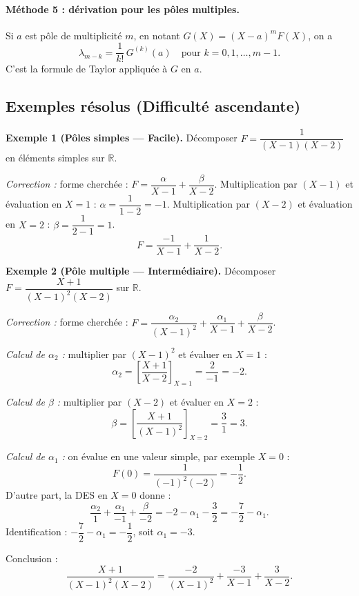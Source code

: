 \documentclass[12pt,a4paper]{report}
\theoremstyle{definition}
\theoremstyle{remark}
\begin{document}
\paragraph{Méthode 5 : dérivation pour les pôles multiples.}
Si $a$ est pôle de multiplicité $m$, en notant $G(X) = (X - a)^m F(X)$, on a
\[ \lambda_{m - k} = \frac{1}{k!}\, G^{(k)}(a) \quad \text{pour } k = 0, 1, \dots, m - 1. \]
C'est la formule de Taylor appliquée à $G$ en $a$.

\subsection{Exemples résolus (Difficulté ascendante)}

\textbf{Exemple 1 (Pôles simples --- Facile).}
Décomposer $F = \dfrac{1}{(X - 1)(X - 2)}$ en éléments simples sur $\mathbb{R}$.

\textit{Correction :} forme cherchée : $F = \dfrac{\alpha}{X - 1} + \dfrac{\beta}{X - 2}$.
Multiplication par $(X - 1)$ et évaluation en $X = 1$ : $\alpha = \dfrac{1}{1 - 2} = -1$.
Multiplication par $(X - 2)$ et évaluation en $X = 2$ : $\beta = \dfrac{1}{2 - 1} = 1$.
\[ F = \frac{-1}{X - 1} + \frac{1}{X - 2}. \]

\medskip

\textbf{Exemple 2 (Pôle multiple --- Intermédiaire).}
Décomposer $F = \dfrac{X + 1}{(X - 1)^2 (X - 2)}$ sur $\mathbb{R}$.

\textit{Correction :} forme cherchée : $F = \dfrac{\alpha_2}{(X - 1)^2} + \dfrac{\alpha_1}{X - 1} + \dfrac{\beta}{X - 2}$.

\smallskip

\emph{Calcul de $\alpha_2$ :} multiplier par $(X - 1)^2$ et évaluer en $X = 1$ :
\[ \alpha_2 = \left[\frac{X + 1}{X - 2}\right]_{X = 1} = \frac{2}{-1} = -2. \]

\emph{Calcul de $\beta$ :} multiplier par $(X - 2)$ et évaluer en $X = 2$ :
\[ \beta = \left[\frac{X + 1}{(X - 1)^2}\right]_{X = 2} = \frac{3}{1} = 3. \]

\emph{Calcul de $\alpha_1$ :} on évalue en une valeur simple, par exemple $X = 0$ :
\[ F(0) = \frac{1}{(-1)^2 (-2)} = -\frac{1}{2}. \]
D'autre part, la DES en $X = 0$ donne :
\[ \frac{\alpha_2}{1} + \frac{\alpha_1}{-1} + \frac{\beta}{-2} = -2 - \alpha_1 - \frac{3}{2} = -\frac{7}{2} - \alpha_1. \]
Identification : $-\dfrac{7}{2} - \alpha_1 = -\dfrac{1}{2}$, soit $\alpha_1 = -3$.

\smallskip

Conclusion :
\[ \frac{X + 1}{(X - 1)^2 (X - 2)} = \frac{-2}{(X - 1)^2} + \frac{-3}{X - 1} + \frac{3}{X - 2}. \]
\end{document}
